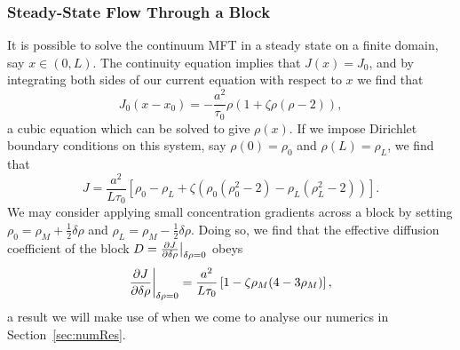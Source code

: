\subsubsection{Steady-State Flow Through a Block}
It is possible to solve the continuum MFT in a steady state on a finite domain, say $x\in(0, L)$. The continuity equation implies that $J(x)=J_0$, and by integrating both sides of our current equation with respect to $x$ we find that
\begin{equation}
 J_0 (x-x_0) = -\frac{a^2}{\tau_0} \rho \left(1+\zeta \rho\left(\rho-2\right)\right),
\end{equation}
a cubic equation which can be solved to give $\rho(x)$. If we impose Dirichlet boundary conditions on this system, say $\rho(0)=\rho_0$ and $\rho(L)=\rho_L$, we find that
\begin{equation}
 J = \frac{a^2}{L \tau_0} \left[ \rho_0 - \rho_L + \zeta \left( \rho_0\left(\rho_0^2-2\right) - \rho_L\left(\rho_L^2-2\right) \right) \right].
\end{equation}
We may consider applying small concentration gradients across a block by setting $\rho_0 = \rho_M + \frac{1}{2}\delta\rho$ and $\rho_L = \rho_M - \frac{1}{2}\delta\rho$. Doing so, we find that the effective diffusion coefficient of the block
$D=\frac{\partial J}{\partial \delta\rho}\big|_{\delta\rho=0}$ obeys
\begin{equation}
\label{eq:MFTflow}
 \frac{\partial J}{\partial \delta\rho}\bigg|_{\delta\rho=0} = \frac{a^2}{L \tau_0} \left[ 1 - \zeta\rho_M(4-3\rho_M) \right],
\end{equation}
a result we will make use of when we come to analyse our numerics in Section~\ref{sec:numRes}.
